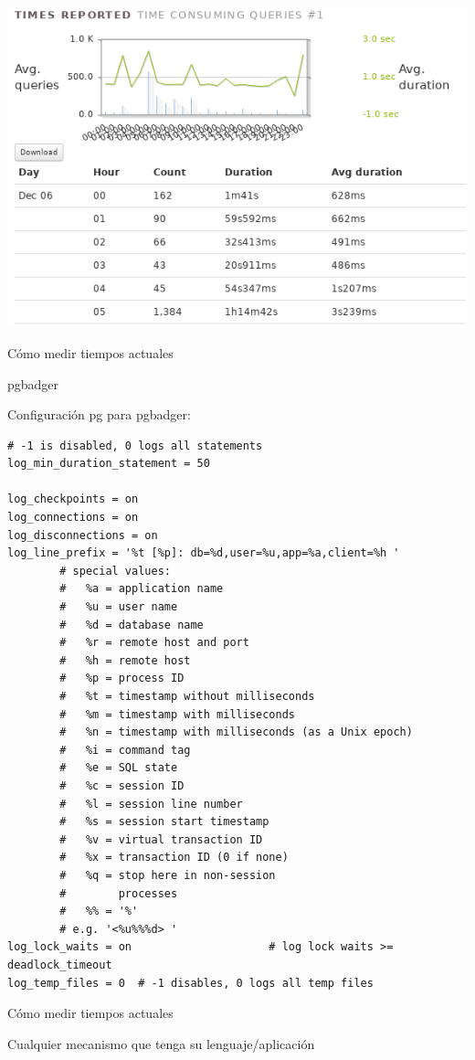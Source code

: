 \documentclass[11pt,spanish]{article}
\newcommand{\rowsp}[1][1em]{\vspace{#1}}
\newcommand{\hone}[1]{{\rowsp[0.3em]\noindent\Large #1 \rowsp[0.3em]}}
\newcommand{\htwo}[1]{{\rowsp\noindent\large #1 \rowsp}}
\begin{document}
\includegraphics[scale=0.4]{img/pgbadger-tm2}

\newpage %
\hone{Cómo medir tiempos actuales}

\htwo{pgbadger}

Configuración pg para pgbadger:

\begin{lstlisting}
# -1 is disabled, 0 logs all statements
log_min_duration_statement = 50 

log_checkpoints = on
log_connections = on
log_disconnections = on
log_line_prefix = '%t [%p]: db=%d,user=%u,app=%a,client=%h '
		# special values:
		#   %a = application name
		#   %u = user name
		#   %d = database name
		#   %r = remote host and port
		#   %h = remote host
		#   %p = process ID
		#   %t = timestamp without milliseconds
		#   %m = timestamp with milliseconds
		#   %n = timestamp with milliseconds (as a Unix epoch)
		#   %i = command tag
		#   %e = SQL state
		#   %c = session ID
		#   %l = session line number
		#   %s = session start timestamp
		#   %v = virtual transaction ID
		#   %x = transaction ID (0 if none)
		#   %q = stop here in non-session
		#        processes
		#   %% = '%'
		# e.g. '<%u%%%d> '
log_lock_waits = on                     # log lock waits >= deadlock_timeout
log_temp_files = 0	# -1 disables, 0 logs all temp files
\end{lstlisting}


\newpage %
\hone{Cómo medir tiempos actuales}

\begin{center}
\htwo{Cualquier mecanismo que tenga su lenguaje/aplicación}
\end{center}
\end{document}
